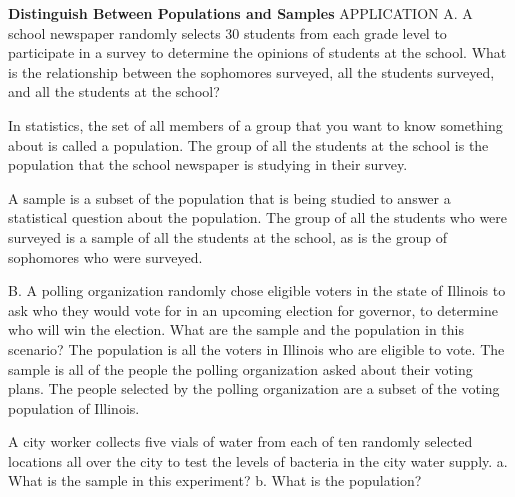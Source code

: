 \documentclass{article}
\newenvironment{example}[1]{}{}         %
\newenvironment{tryit}[1]{}{}           %
\newcommand{\answer}[1]{}               %
\newcommand{\placeholder}[2]{}          %
\newcommand{\te}[1]{}                   %
\begin{document}
\begin{example}{3}
\textbf{Distinguish Between Populations and Samples}
APPLICATION
A. A school newspaper randomly selects 30 students from each grade level to participate in a survey to determine the opinions of students at the school. What is the relationship between the sophomores surveyed, all the students surveyed, and all the students at the school?
\placeholder{photo}{Four photographs of students arranged around a blue oval Surveyed Students. Top left Freshmen with green border, top right Sophomores red, bottom left Juniors purple, bottom right Seniors blue.}
In statistics, the set of all members of a group that you want to know something about is called a population. The group of all the students at the school is the population that the school newspaper is studying in their survey.
\te{COMMON ERROR In statistics, a ``population'' does not have to be made up of people. The population is whatever whole group that is under statistical study---it could be a group of corporations, a group of bodies of water, or a group of cars of different models.}
A sample is a subset of the population that is being studied to answer a statistical question about the population. The group of all the students who were surveyed is a sample of all the students at the school, as is the group of sophomores who were surveyed.
\answer{A. All the students at the school are the population; all the students surveyed and the sophomores surveyed are samples.}
B. A polling organization randomly chose eligible voters in the state of Illinois to ask who they would vote for in an upcoming election for governor, to determine who will win the election. What are the sample and the population in this scenario?
The population is all the voters in Illinois who are eligible to vote. The sample is all of the people the polling organization asked about their voting plans. The people selected by the polling organization are a subset of the voting population of Illinois.
\answer{B. The population is all the voters in Illinois who are eligible to vote. The sample is all of the people the polling organization asked about their voting plans.}
\te{HAVE A GROWTH MINDSET After receiving constructive feedback, how do you use it as an opportunity to improve?}
\end{example}
\begin{tryit}{3}
A city worker collects five vials of water from each of ten randomly selected locations all over the city to test the levels of bacteria in the city water supply.
a. What is the sample in this experiment?
b. What is the population?
\answer{a. the fifty vials of water; b. the city's entire water supply}
\end{tryit}
\end{document}
